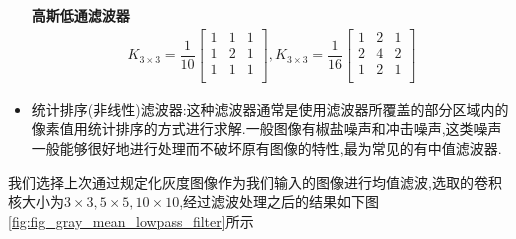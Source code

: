 \documentclass[UTF8,a4paper,10pt]{ctexart}
\begin{document}
\begin{flushleft}
\begin{itemize}
            \hspace{2em}\textbf{高斯低通滤波器}
            \begin{eqnarray}
                K_{3\times{3}}=\dfrac{1}{10}\left[\begin{array}{ccc}
                    1 & 1 & 1\\
                    1 & 2 & 1\\
                    1 & 1 & 1\\
                \end{array}\right],K_{3\times{3}}=\dfrac{1}{16}\left[\begin{array}{ccc}
                    1 & 2 & 1\\
                    2 & 4 & 2\\
                    1 & 2 & 1\\
                \end{array}\right]\nonumber
            \end{eqnarray}
            \item 统计排序(非线性)滤波器:这种滤波器通常是使用滤波器所覆盖的部分区域内的像素值用统计排序的方式进行求解.一般图像有椒盐噪声和冲击噪声,这类噪声一般能够很好地进行处理而不破坏原有图像的特性,最为常见的有中值滤波器.
        \end{itemize}
        \hspace{2em}我们选择上次通过规定化灰度图像作为我们输入的图像进行均值滤波,选取的卷积核大小为$3\times{3},5\times{5},10\times{10}$,经过滤波处理之后的结果如下图\ref{fig:fig_gray_mean_lowpass_filter}所示\\
        \begin{figure}[htbp]
            \centering
            \quad
\end{figure}
\end{flushleft}
\end{document}
